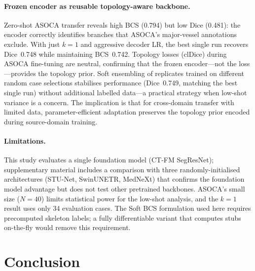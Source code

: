 \documentclass[runningheads]{llncs}
\begin{document}
\paragraph{Frozen encoder as reusable topology-aware backbone.}
Zero-shot ASOCA transfer reveals high BCS (0.794) but low Dice (0.481): the encoder correctly identifies branches that ASOCA's major-vessel annotations exclude.
With just $k{=}1$ and aggressive decoder LR, the best single run recovers Dice~0.748 while maintaining BCS~0.742.
Topology losses (clDice) during ASOCA fine-tuning are neutral, confirming that the frozen encoder---not the loss---provides the topology prior.
Soft ensembling of replicates trained on different random case selections stabilises performance (Dice~0.749, matching the best single run) without additional labelled data---a practical strategy when low-shot variance is a concern.
The implication is that for cross-domain transfer with limited data, parameter-efficient adaptation preserves the topology prior encoded during source-domain training.

\paragraph{Limitations.}
This study evaluates a single foundation model (CT-FM SegResNet); supplementary material includes a comparison with three randomly-initialised architectures (STU-Net, SwinUNETR, MedNeXt) that confirms the foundation model advantage but does not test other pretrained backbones.
ASOCA's small size ($N{=}40$) limits statistical power for the low-shot analysis, and the $k{=}1$ result uses only 34 evaluation cases.
The Soft BCS formulation used here requires precomputed skeleton labels; a fully differentiable variant that computes stubs on-the-fly would remove this requirement.

\section{Conclusion}
\end{document}

